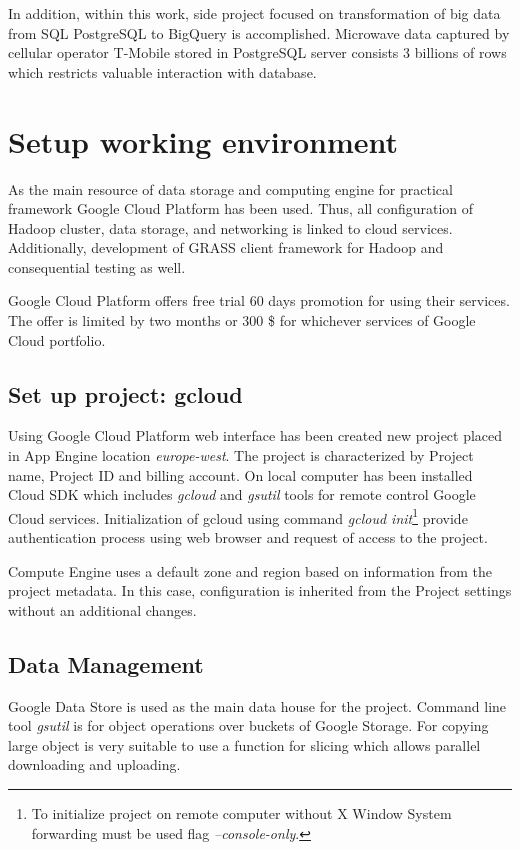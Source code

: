 \documentclass[a4paper,12pt,oneside]{report}
\begin{document}
	In addition, within this work, side project focused on transformation of big data from SQL
	PostgreSQL to BigQuery is accomplished. Microwave data captured by cellular operator T-Mobile 
	stored in PostgreSQL server	consists 3 billions of rows which 
	restricts valuable interaction with database.
	
	
	\section{Setup working environment}\label{setup_w_e}
	As the main resource of data storage and computing engine for practical
	framework Google Cloud Platform has been used. Thus, all configuration of Hadoop 
	cluster, data storage, and networking is linked to cloud services. Additionally,
	development of GRASS client framework for Hadoop and consequential testing  as
	well.
	
	Google Cloud Platform offers free trial 60 days promotion for using their
	services. The offer is limited by two months or 300 \$ for whichever services
	of Google Cloud portfolio.
	
	\subsection{Set up project: gcloud}\label{setup_gcloud}
	Using Google Cloud Platform web interface has been created new project placed in
	App Engine location \textit{europe-west}. The project is characterized by Project name,
	Project ID and billing account.	On local computer has been installed Cloud SDK 
	which includes \textit{gcloud} 	and \textit{gsutil} tools for remote control Google Cloud services.
	Initialization of gcloud using command \emph{gcloud init}\footnote{To initialize
	project on remote computer 	without X Window System forwarding must be used flag 
	\emph{--console-only}.}	provide authentication process using web browser 
	and request of access to the project.
	
	Compute Engine uses a default zone and region based on information from the
	project metadata. In this case,	configuration is inherited from the Project 
	settings without an additional changes.
	
	
	\subsection{Data Management}\label{data_mgr}
	Google Data Store is used as the main data house for the project. Command
	line tool \textit{gsutil} is for  object operations over buckets of Google Storage. 
	For copying large	object is very suitable to use 	a function for slicing which allows parallel 
	downloading and uploading.
	
\end{document}
